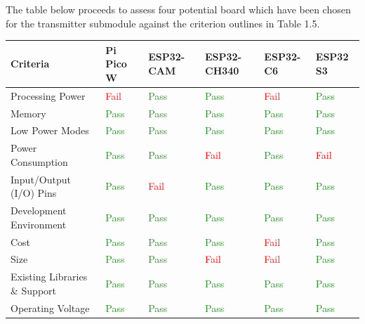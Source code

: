 \documentclass[class=report,11pt,crop=false]{standalone}
\begin{document}
The table below proceeds to assess four potential board which have been chosen for the transmitter submodule against the criterion outlines in Table 1.5.

\begin{table}[h]
\centering
\begin{tabular}{|p{3.5cm}|l|l|l|l|l|}
\hline
\textbf{Criteria} & \textbf{Pi Pico W} & \textbf{ESP32-CAM} & \textbf{ESP32-CH340} & \textbf{ESP32-C6} & \textbf{ESP32 S3} \\
\hline
Processing Power & \textcolor{red}{Fail} & \textcolor{ForestGreen}{Pass} & \textcolor{ForestGreen}{Pass} & \textcolor{red}{Fail} & \textcolor{ForestGreen}{Pass} \\
\hline
Memory & \textcolor{ForestGreen}{Pass} & \textcolor{ForestGreen}{Pass} & \textcolor{ForestGreen}{Pass} & \textcolor{ForestGreen}{Pass} & \textcolor{ForestGreen}{Pass} \\
\hline
Low Power Modes & \textcolor{ForestGreen}{Pass} & \textcolor{ForestGreen}{Pass} & \textcolor{ForestGreen}{Pass} & \textcolor{ForestGreen}{Pass} & \textcolor{ForestGreen}{Pass} \\
\hline
Power Consumption & \textcolor{ForestGreen}{Pass} & \textcolor{ForestGreen}{Pass} & \textcolor{red}{Fail} & \textcolor{ForestGreen}{Pass} & \textcolor{red}{Fail} \\
\hline
Input/Output (I/O) Pins & \textcolor{ForestGreen}{Pass} & \textcolor{red}{Fail} & \textcolor{ForestGreen}{Pass} & \textcolor{ForestGreen}{Pass} & \textcolor{ForestGreen}{Pass} \\
\hline
Development Environment & \textcolor{ForestGreen}{Pass} & \textcolor{ForestGreen}{Pass} & \textcolor{ForestGreen}{Pass} & \textcolor{ForestGreen}{Pass} & \textcolor{ForestGreen}{Pass} \\
\hline
Cost & \textcolor{ForestGreen}{Pass} & \textcolor{ForestGreen}{Pass} & \textcolor{ForestGreen}{Pass} & \textcolor{red}{Fail} & \textcolor{ForestGreen}{Pass} \\
\hline
Size & \textcolor{ForestGreen}{Pass} & \textcolor{ForestGreen}{Pass} & \textcolor{red}{Fail} & \textcolor{red}{Fail} & \textcolor{ForestGreen}{Pass} \\
\hline
Existing Libraries \& Support & \textcolor{ForestGreen}{Pass} & \textcolor{ForestGreen}{Pass} & \textcolor{ForestGreen}{Pass} & \textcolor{ForestGreen}{Pass} & \textcolor{ForestGreen}{Pass} \\
\hline
Operating Voltage & \textcolor{ForestGreen}{Pass} & \textcolor{ForestGreen}{Pass} & \textcolor{ForestGreen}{Pass} & \textcolor{ForestGreen}{Pass} & \textcolor{ForestGreen}{Pass} \\

\end{tabular}
\end{table}
\end{document}
